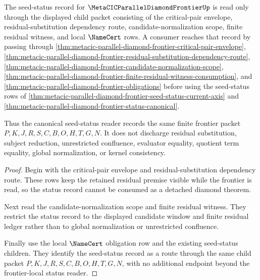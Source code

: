 \begin{theorem}
\label{thm:metacic-parallel-diamond-frontier-seed-status-canonical}
The seed-status record for $\MetaCICParallelDiamondFrontierUp$ is read only through the displayed child packet consisting of the critical-pair envelope, residual-substitution dependency route, candidate-normalization scope, finite residual witness, and local $\NameCert$ rows. A consumer reaches that record by passing through \autoref{thm:metacic-parallel-diamond-frontier-critical-pair-envelope}, \autoref{thm:metacic-parallel-diamond-frontier-residual-substitution-dependency-route}, \autoref{thm:metacic-parallel-diamond-frontier-candidate-normalization-scope}, \autoref{thm:metacic-parallel-diamond-frontier-finite-residual-witness-consumption}, and \autoref{thm:metacic-parallel-diamond-frontier-obligations} before using the seed-status rows of \autoref{thm:metacic-parallel-diamond-frontier-seed-status-current-axis} and \autoref{thm:metacic-parallel-diamond-frontier-status-canonical}.

Thus the canonical seed-status reader records the same finite frontier packet $P,K,J,R,S,C,B,O,H,T,G,N$. It does not discharge residual substitution, subject reduction, unrestricted confluence, evaluator equality, quotient term equality, global normalization, or kernel consistency.
\end{theorem}
\begin{proof}
Begin with the critical-pair envelope and residual-substitution dependency route. These rows keep the retained residual premise visible while the frontier is read, so the status record cannot be consumed as a detached diamond theorem.

Next read the candidate-normalization scope and finite residual witness. They restrict the status record to the displayed candidate window and finite residual ledger rather than to global normalization or unrestricted confluence.

Finally use the local $\NameCert$ obligation row and the existing seed-status children. They identify the seed-status record as a route through the same child packet $P,K,J,R,S,C,B,O,H,T,G,N$, with no additional endpoint beyond the frontier-local status reader.
\end{proof}
